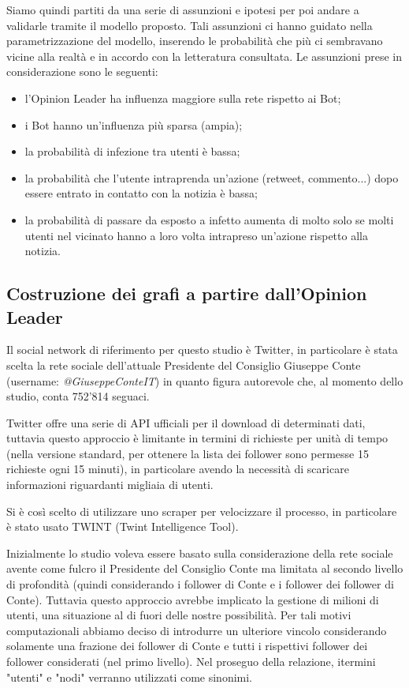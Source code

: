 Siamo quindi partiti da una serie di assunzioni e ipotesi per poi andare a validarle tramite il modello proposto. Tali assunzioni ci hanno guidato nella parametrizzazione del modello, inserendo le probabilità che più ci sembravano vicine alla realtà e in accordo con la letteratura consultata. Le assunzioni prese in considerazione sono le seguenti:
\begin{itemize}
    \item l'Opinion Leader ha influenza maggiore sulla rete rispetto ai Bot;
    \item i Bot hanno un'influenza più sparsa (ampia);
    \item la probabilità di infezione tra utenti è bassa;
    \item la probabilità che l’utente intraprenda un'azione (retweet, commento...) dopo essere entrato in contatto con la notizia è bassa;
    \item la probabilità di passare da esposto a infetto aumenta di molto solo se molti utenti nel vicinato hanno a loro volta intrapreso un'azione rispetto alla notizia.
\end{itemize}

\subsection{Costruzione dei grafi a partire dall'Opinion Leader}
    Il social network di riferimento per questo studio è Twitter, in particolare è stata scelta la rete sociale dell’attuale Presidente del Consiglio Giuseppe Conte (username: \textit{@GiuseppeConteIT}\cite{twitterGiuseppeConte}) in quanto figura autorevole che, al momento dello studio, conta 752'814 seguaci. 
    
    Twitter offre una serie di API ufficiali per il download di determinati dati, tuttavia questo approccio è limitante in termini di richieste per unità di tempo (nella versione standard, per ottenere la lista dei follower sono permesse 15 richieste ogni 15 minuti), in particolare avendo la necessità di scaricare informazioni riguardanti migliaia di utenti.
    
    Si è così scelto di utilizzare uno scraper per velocizzare il processo, in particolare è stato usato TWINT\cite{Twint} (Twint Intelligence Tool).
    
    Inizialmente lo studio voleva essere basato sulla considerazione della rete sociale avente come fulcro il Presidente del Consiglio Conte ma limitata al secondo livello di profondità (quindi considerando i follower di Conte e i follower dei follower di Conte). Tuttavia questo approccio avrebbe implicato la gestione di milioni di utenti, una situazione al di fuori delle nostre possibilità. Per tali motivi computazionali abbiamo deciso di introdurre un ulteriore vincolo considerando solamente una frazione dei follower di Conte e tutti i rispettivi follower dei follower considerati (nel primo livello). Nel proseguo della relazione, itermini "utenti" e "nodi" verranno utilizzati come sinonimi.
    
